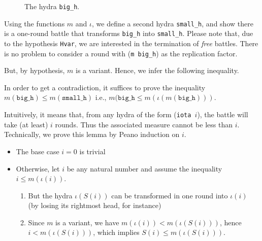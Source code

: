 \begin{figure}[htb]
\centering
{}
\caption{\label{fig:h-omega-omega}}
 The hydra \texttt{big\_h}.
\end{figure}




 Using the functions $m$ and $\iota$, we define a second hydra \texttt{small\_h}, and show
 there is a one-round battle that transforms \texttt{big\_h} into \texttt{small\_h}. Please note that,
due to the hypothesis \texttt{Hvar}, we are interested in the termination of \emph{free} battles. 
There is no problem to consider a round with (\texttt{m big\_h}) as the replication factor.





 
But, by hypothesis, $m$ is a variant. Hence, we infer the following inequality.

\vspace{4pt}




In order to get a contradiction, it suffices to  prove the inequality
$m(\texttt{big\_h}) \leq m(\texttt{small\_h})$ i.e.,  $m(\texttt{big\_h}\leq m(\iota (m(\texttt{big\_h})))$.





Intuitively, it means that, from any hydra of the form (\texttt{iota $i$}), the battle will 
take (at least) $i$ rounds. Thus the associated measure cannot be less than $i$.
Technically, we prove this lemma by Peano induction on $i$.

\begin{itemize}
\item The base case $i=0$ is trivial
\item Otherwise, let $i$ be any natural number and assume  the inequality
  $i \leq m(\iota(i))$.
  \begin{enumerate}
  \item  But the hydra $\iota(S(i))$ can be transformed in one round into
    $\iota(i)$ (by losing its rightmost head, for instance)
  \item Since $m$ is a variant, we have $m(\iota(i)) < m(\iota(S(i)))$,
    hence  $i< m(\iota(S(i)))$, which implies  $S(i)\leq  m(\iota(S(i)))$.
  \end{enumerate}
\end{itemize}

